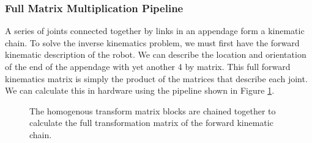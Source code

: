 \subsubsection{Full Matrix Multiplication Pipeline}

A series of joints connected together by links in an appendage form a kinematic chain. To solve the inverse kinematics problem, we must first have the forward kinematic description of the robot. We can describe the location and orientation of the end of the appendage with yet another 4 by matrix. This full forward kinematics matrix is simply the product of the matrices that describe each joint. We can calculate this in hardware using the pipeline shown in Figure \ref{fig:dh_transform_pipeline}.

\begin{figure}[ht]
\center
{}
\caption{The homogenous transform matrix blocks are chained together to calculate the full transformation matrix of the forward kinematic chain.}
\label{fig:dh_transform_pipeline}
\end{figure}
